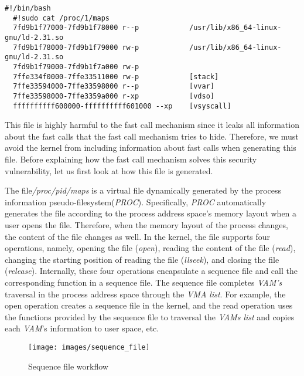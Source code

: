  
\begin{lstlisting}[style=BASHStyle]
  #!/bin/bash
  #!sudo cat /proc/1/maps
  7fd9b1f77000-7fd9b1f78000 r--p            /usr/lib/x86_64-linux-gnu/ld-2.31.so
  7fd9b1f78000-7fd9b1f79000 rw-p            /usr/lib/x86_64-linux-gnu/ld-2.31.so
  7fd9b1f79000-7fd9b1f7a000 rw-p  
  7ffe334f0000-7ffe33511000 rw-p            [stack]
  7ffe33594000-7ffe33598000 r--p            [vvar]
  7ffe33598000-7ffe3359a000 r-xp            [vdso]
  ffffffffff600000-ffffffffff601000 --xp    [vsyscall]
\end{lstlisting}

This file is highly harmful to the fast call mechanism since 
it leaks all information about the fast calls that the fast call 
mechanism tries to hide. Therefore, we must avoid the kernel from 
including information about fast calls when generating this file. 
Before explaining how the fast call mechanism solves this security 
vulnerability, let us first look at how this file is generated.

The file\emph{/proc/pid/maps} is a virtual file dynamically
generated by the process information pseudo-filesystem\cite{23}(\emph{PROC}). 
Specifically, \emph{PROC} automatically generates the file according to 
the process address space's memory layout when a user opens the file. 
Therefore, when the memory layout of the process changes, the content 
of the file changes as well. In the kernel, the file supports four operations, 
namely, opening the file (\emph{open}), reading the content of the file (\emph{read}), 
changing the starting position of reading the file (\emph{llseek}), and 
closing the file (\emph{release}).  Internally, these four operations 
encapsulate a sequence file and call the corresponding function in a sequence file.
The sequence file completes \emph{VAM's} traversal in the process address space 
through the \emph{VMA list}. For example, the open operation 
creates a sequence file in the kernel, and the read operation uses the 
functions provided by the sequence file to traversal the \emph{VAMs list} and copies 
each \emph{VAM}'s information to user space, etc.





\begin{figure}[tbp]
  \centering
  \texttt{[image: images/sequence\_file]}
  \caption[Short description]{Sequence file workflow}
  \label{fig:sequence_file}
\end{figure}

